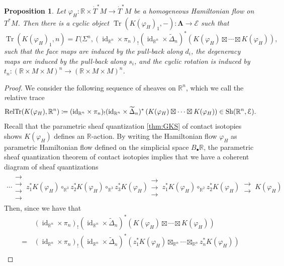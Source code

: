 \documentclass[11pt]{amsart}
\numberwithin{equation}{section}
\theoremstyle{plain}
\newtheorem{Prop}[prop]{Proposition}
\theoremstyle{definition}
\theoremstyle{remark}
\newcommand{\bR} { {\mathbb{R}}}
\newcommand{\cE} { {\mathcal{E}}}
\newcommand{\id}{{\operatorname{id}}}
\newcommand{\Sh} { {\operatorname{Sh}}}
\newcommand\Tr{\operatorname{Tr}}
\begin{document}
\begin{Prop}\label{prop: circle action Ham}
Let $\varphi_H: \bR \times \dot T^*M \to \dot T^*M$ be a homogeneous Hamiltonian flow on $T^*M$. Then there is a cyclic object $\Tr(K(\varphi_H)_1,-): \boldsymbol{\Lambda} \to \cE$ such that
\[\Tr(K(\varphi_H)_1, n) = \Gamma(\Sigma^n, (\id_{\bR^n}\times \pi_{n})_! (\id_{\bR^n}\times \widetilde{\Delta}_n)^* (K(\varphi_H) \boxtimes \cdots \boxtimes K(\varphi_H)),\]
such that the face maps are induced by the pull-back along $d_i$, the degeneracy maps are induced by the pull-back along $s_i$, and the cyclic rotation is induced by $t_n: (\bR \times M \times M)^n \to (\bR \times M \times M)^n$.
\end{Prop}
\begin{proof}
We consider the following sequence of sheaves on $\bR^n$, which we call the {\emph relative trace}
\[\RelTr(K(\varphi_H), \bR^n)\coloneqq (\id_{\bR^n}\times \pi_{n})_! (\id_{\bR^n}\times \widetilde{\Delta}_n)^* \left(K(\varphi_H) \boxtimes \cdots \boxtimes K(\varphi_H) \right)\in \Sh(\bR^n,\cE).\]
Recall that the parametric sheaf quantization \autoref{thm:GKS} of contact isotopies \cite[Remark 4.9]{GKS2012} shows $K(\varphi_H)$ defines an $\bR$-action. By writing the Hamiltonian flow $\varphi_H$ as parametric Hamiltonian flow defined on the simplicial space $B_\bullet\bR$, the parametric sheaf quantization theorem of contact isotopies implies that we have a coherent diagram of sheaf quantizations
\begin{align*}
\cdots \substack{\longrightarrow \\[-0.8em] \longrightarrow \\[-0.8em] \longrightarrow \\[-0.8em] \longrightarrow }\, z_1^*K(\varphi_H) \circ_{\bR^3} z_2^*K(\varphi_H) \circ_{\bR^3} z_3^*K(\varphi_H) \substack{\longrightarrow \\[-0.8em] \longrightarrow \\[-0.8em] \longrightarrow }\, z_1^*K(\varphi_H) \circ_{\bR^2} z_2^*K(\varphi_H) \,\substack{\longrightarrow \\[-0.8em] \longrightarrow }\, K(\varphi_H) 
\end{align*}
Then, since we have that
\begin{align*}
&\,(\id_{\bR^n}\times \pi_{n})_! (\id_{\bR^n}\times \widetilde{\Delta}_n)^* \left(K(\varphi_H) \boxtimes \cdots \boxtimes K(\varphi_H) \right) \\
=&\,(\id_{\bR^n}\times \pi_{n})_! (\id_{\bR^n}\times \widetilde{\Delta}_n)^* \left(z_1^*K(\varphi_H) \boxtimes_{\bR^n} \cdots \boxtimes_{\bR^n} z_n^*K(\varphi_H) \right) \\

\end{align*}
\end{proof}
\end{document}
